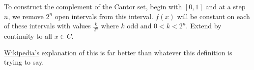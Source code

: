 \begin{definition}
    To construct the complement of the Cantor set, begin with $[0, 1]$ and at a step $n$, we remove $2^n$ open intervals from this interval. $f(x)$ will be constant on each of these intervals with values $\frac{k}{2^n}$ where $k$ odd and $0 < k < 2^n$. Extend by continuity to all $x \in C$.
\end{definition}

\begin{remark}
    \href{https://en.wikipedia.org/wiki/Cantor_function}{Wikipedia's} explanation of this is far better than whatever this definition is trying to say.
\end{remark}
